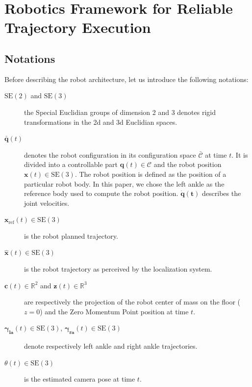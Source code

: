 \section{Robotics Framework for Reliable Trajectory Execution}\label{sec:architecture}

\subsection{Notations}

Before describing the robot architecture, let us introduce the
following notations:

\begin{description}
\item[$\text{SE}(2)$ and $\text{SE}(3)$]\hspace{1.45cm} the Special
  Euclidian groups of dimension 2 and 3 denotes rigid transformations
  in the 2d and 3d Euclidian spaces.
\item[$\mathbf{\bar{q}}(t)$] denotes the robot configuration in its
  configuration space $\mathcal{\bar{C}}$ at time $t$. It is divided
  into a controllable part $\mathbf{q}(t) \in \mathcal{C}$ and the
  robot position $\mathbf{x}(t) \in \text{SE}(3)$. The robot position
  is defined as the position of a particular robot body. In this
  paper, we chose the left ankle as the reference body used to compute
  the robot position. $\mathbf{\dot{q}(t)}$ describes the joint
  velocities.
\item[$\mathbf{x}_{\text{ref}}(t) \in \text{SE}(3)$] \hspace{1.2cm} is
  the robot planned trajectory.
\item[$\mathbf{\hat{x}}(t) \in \text{SE}(3)$] \hspace{.8cm} is the
  robot trajectory as perceived by the localization system.
\item[$\mathbf{c}(t) \in \mathbb{R}^2$ and $\mathbf{z}(t) \in
  \mathbb{R}^3$]\hspace{2.6cm} are respectively the projection of the
  robot center of mass on the floor ($z = 0$) and the Zero Momentum
  Point position at time $t$.
\item[$\mathbf{\gamma_{\text{la}}}(t) \in \text{SE}(3)$, $\mathbf{\gamma_{\text{ra}}}(t)
  \in \text{SE}(3)$]\hspace{3.4cm} denote respectively left ankle and
  right ankle trajectories.
\item[$\theta(t) \in \text{SE}(3)$]\hspace{0.8cm} is the estimated
  camera pose at time $t$.
\end{description}

